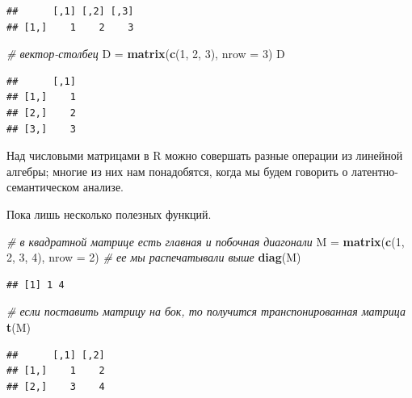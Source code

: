 \documentclass[
]{book}
\newenvironment{Shaded}{\begin{snugshade}}{\end{snugshade}}
\newcommand{\AttributeTok}[1]{\textcolor[rgb]{0.13,0.29,0.53}{#1}}
\newcommand{\CommentTok}[1]{\textcolor[rgb]{0.56,0.35,0.01}{\textit{#1}}}
\newcommand{\DecValTok}[1]{\textcolor[rgb]{0.00,0.00,0.81}{#1}}
\newcommand{\FunctionTok}[1]{\textcolor[rgb]{0.13,0.29,0.53}{\textbf{#1}}}
\newcommand{\NormalTok}[1]{#1}
\newcommand{\OtherTok}[1]{\textcolor[rgb]{0.56,0.35,0.01}{#1}}
\theoremstyle{definition}
\theoremstyle{definition}
\theoremstyle{definition}
\theoremstyle{definition}
\theoremstyle{remark}
\begin{document}
\begin{verbatim}
##      [,1] [,2] [,3]
## [1,]    1    2    3
\end{verbatim}

\begin{Shaded}
\begin{Highlighting}[]
\CommentTok{\# вектор{-}столбец}
\NormalTok{D }\OtherTok{=} \FunctionTok{matrix}\NormalTok{(}\FunctionTok{c}\NormalTok{(}\DecValTok{1}\NormalTok{, }\DecValTok{2}\NormalTok{, }\DecValTok{3}\NormalTok{), }\AttributeTok{nrow =} \DecValTok{3}\NormalTok{)}
\NormalTok{D}
\end{Highlighting}
\end{Shaded}

\begin{verbatim}
##      [,1]
## [1,]    1
## [2,]    2
## [3,]    3
\end{verbatim}

Над числовыми матрицами в R можно совершать разные операции из линейной алгебры; многие из них нам понадобятся, когда мы будем говорить о латентно-семантическом анализе.

Пока лишь несколько полезных функций.

\begin{Shaded}
\begin{Highlighting}[]
\CommentTok{\# в квадратной матрице есть главная и побочная диагонали}
\NormalTok{M }\OtherTok{=} \FunctionTok{matrix}\NormalTok{(}\FunctionTok{c}\NormalTok{(}\DecValTok{1}\NormalTok{, }\DecValTok{2}\NormalTok{, }\DecValTok{3}\NormalTok{, }\DecValTok{4}\NormalTok{), }\AttributeTok{nrow =} \DecValTok{2}\NormalTok{) }\CommentTok{\# ее мы распечатывали выше}
\FunctionTok{diag}\NormalTok{(M)}
\end{Highlighting}
\end{Shaded}

\begin{verbatim}
## [1] 1 4
\end{verbatim}

\begin{Shaded}
\begin{Highlighting}[]
\CommentTok{\# если поставить матрицу на бок, то получится транспонированная матрица}
\FunctionTok{t}\NormalTok{(M)}
\end{Highlighting}
\end{Shaded}

\begin{verbatim}
##      [,1] [,2]
## [1,]    1    2
## [2,]    3    4
\end{verbatim}
\end{document}
